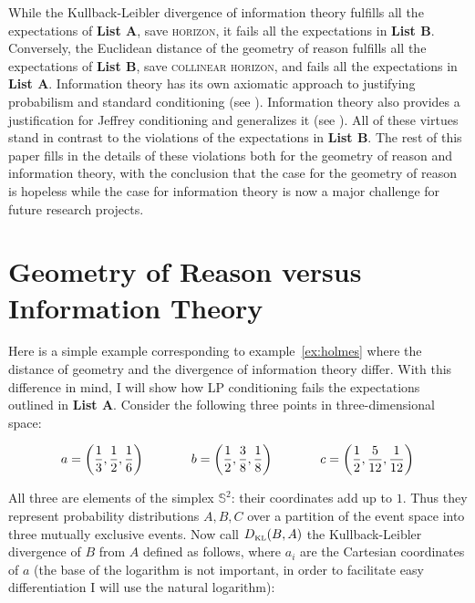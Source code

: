 \documentclass[smallextended]{svjour3}       %
\begin{document}
While the Kullback-Leibler divergence of information theory fulfills
all the expectations of \textbf{List A}, save \textsc{horizon}, it
fails all the expectations in \textbf{List B}. Conversely, the
Euclidean distance of the geometry of reason fulfills all the
expectations of \textbf{List B}, save \textsc{collinear horizon}, and
fails all the expectations in \textbf{List A}. Information theory has
its own axiomatic approach to justifying probabilism and standard
conditioning (see ). Information theory
also provides a justification for Jeffrey conditioning and generalizes
it (see ). All of these virtues stand in contrast
to the violations of the expectations in \textbf{List B}. The rest of
this paper fills in the details of these violations both for the
geometry of reason and information theory, with the conclusion that
the case for the geometry of reason is hopeless while the case for
information theory is now a major challenge for future research
projects.

\section{Geometry of Reason versus Information Theory}
\label{grit}

Here is a simple example corresponding to example~\ref{ex:holmes}
where the distance of geometry and the divergence of information
theory differ. With this difference in mind, I will show how LP
conditioning fails the expectations outlined in \textbf{List A}.
Consider the following three points in three-dimensional space:

\begin{equation}
  \label{eq:e6}
    a=\left(\frac{1}{3},\frac{1}{2},\frac{1}{6}\right) \hspace{.5in}
    b=\left(\frac{1}{2},\frac{3}{8},\frac{1}{8}\right)  \hspace{.5in}
    c=\left(\frac{1}{2},\frac{5}{12},\frac{1}{12}\right)
\end{equation}

All three are elements of the simplex $\mathbb{S}^{2}$: their
coordinates add up to $1$. Thus they represent probability
distributions $A,B,C$ over a partition of the event space into three
mutually exclusive events. Now call $D_{\mbox{\tiny KL}}(B,A)$ the
Kullback-Leibler divergence of $B$ from $A$ defined as follows, where
$a_{i}$ are the Cartesian coordinates of $a$ (the base of the
logarithm is not important, in order to facilitate easy
differentiation I will use the natural logarithm):
\end{document}
